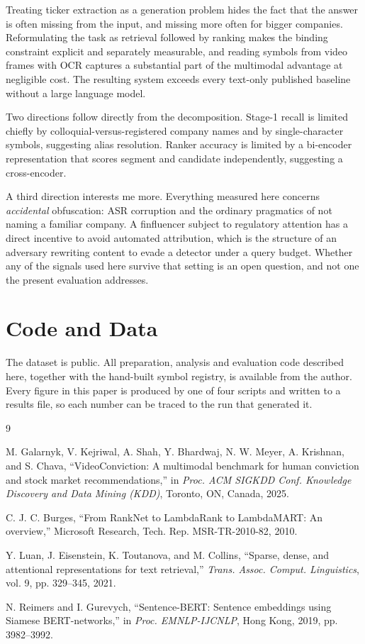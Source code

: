 \documentclass[conference]{IEEEtran}
\begin{document}
Treating ticker extraction as a generation problem hides the fact that the
answer is often missing from the input, and missing more often for bigger
companies. Reformulating the task as retrieval followed by ranking makes the binding
constraint explicit and separately measurable, and reading symbols from video
frames with OCR captures a substantial part of the multimodal advantage at
negligible cost. The resulting system exceeds every text-only published baseline
without a large language model.

Two directions follow directly from the decomposition. Stage-1 recall is limited
chiefly by colloquial-versus-registered company names and by single-character
symbols, suggesting alias resolution. Ranker accuracy is limited by a bi-encoder
representation that scores segment and candidate independently, suggesting a
cross-encoder.

A third direction interests me more. Everything measured here concerns
\emph{accidental} obfuscation: ASR corruption and the ordinary pragmatics of not
naming a familiar company. A finfluencer subject to regulatory attention has a
direct incentive to avoid automated attribution, which is the structure of an
adversary rewriting content to evade a detector under a query budget. Whether
any of the signals used here survive that setting is an open question, and not
one the present evaluation addresses.

\section*{Code and Data}

The dataset is public. All preparation, analysis and evaluation code described
here, together with the hand-built symbol registry, is available from the
author. Every figure in this paper is produced by one of four scripts and
written to a results file, so each number can be traced to the run that
generated it.

\begin{thebibliography}{9}

M. Galarnyk, V. Kejriwal, A. Shah, Y. Bhardwaj, N. W. Meyer, A. Krishnan, and
S. Chava, ``VideoConviction: A multimodal benchmark for human conviction and
stock market recommendations,'' in \emph{Proc. ACM SIGKDD Conf. Knowledge
Discovery and Data Mining (KDD)}, Toronto, ON, Canada, 2025.

C. J. C. Burges, ``From RankNet to LambdaRank to LambdaMART: An overview,''
Microsoft Research, Tech. Rep. MSR-TR-2010-82, 2010.

Y. Luan, J. Eisenstein, K. Toutanova, and M. Collins, ``Sparse, dense, and
attentional representations for text retrieval,'' \emph{Trans. Assoc. Comput.
Linguistics}, vol. 9, pp. 329--345, 2021.

N. Reimers and I. Gurevych, ``Sentence-BERT: Sentence embeddings using Siamese
BERT-networks,'' in \emph{Proc. EMNLP-IJCNLP}, Hong Kong, 2019, pp. 3982--3992.

\end{thebibliography}
\end{document}
